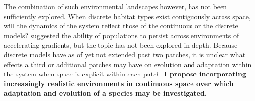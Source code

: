 The combination of such environmental landscapes however, has not been sufficiently explored. When discrete habitat types exist contiguously across space, will the dynamics of the system reflect those of the continuous or the discrete models? \citet{Barton:2001} suggested the ability of populations to persist across environments of accelerating gradients, but the topic has not been explored in depth. Because discrete models have as of yet not extended past two patches, it is unclear what effects a third or additional patches may have on evolution and adaptation within the system when space is explicit within each patch. \textbf{I propose incorporating increasingly realistic environments in continuous space over which adaptation and evolution of a species may be investigated.}




